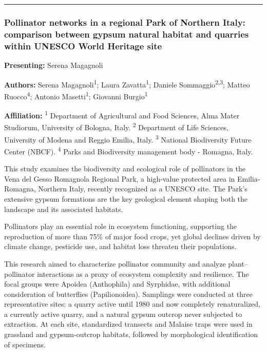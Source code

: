 \documentclass[
  letterpaper,
  DIV=11,
  numbers=noendperiod]{scrartcl}
\begin{document}
\begin{center}\rule{0.5\linewidth}{0.5pt}\end{center}

\subsubsection{Pollinator networks in a regional Park of Northern Italy:
comparison between gypsum natural habitat and quarries within UNESCO
World Heritage
site}\label{pollinator-networks-in-a-regional-park-of-northern-italy-comparison-between-gypsum-natural-habitat-and-quarries-within-unesco-world-heritage-site}

\textbf{Presenting:} Serena Magagnoli

\textbf{Authors:} Serena Magagnoli\textsuperscript{1}; Laura
Zavatta\textsuperscript{1}; Daniele Sommaggio\textsuperscript{2,3};
Matteo Ruocco\textsuperscript{4}; Antonio Masetti\textsuperscript{1};
Giovanni Burgio\textsuperscript{1}

\textbf{Affiliation:} \textsuperscript{1} Department of Agricultural and
Food Sciences, Alma Mater Studiorum, University of Bologna, Italy.
\textsuperscript{2} Department of Life Sciences, University of Modena
and Reggio Emilia, Italy. \textsuperscript{3} National Biodiversity
Future Center (NBCF). \textsuperscript{4} Parks and Biodiversity
management body - Romagna, Italy.

This study examines the biodiversity and ecological role of pollinators
in the Vena del Gesso Romagnola Regional Park, a high-value protected
area in Emilia-Romagna, Northern Italy, recently recognized as a UNESCO
site. The Park's extensive gypsum formations are the key geological
element shaping both the landscape and its associated habitats.

Pollinators play an essential role in ecosystem functioning, supporting
the reproduction of more than 75\% of major food crops, yet global
declines driven by climate change, pesticide use, and habitat loss
threaten their populations.

This research aimed to characterize pollinator community and analyze
plant--pollinator interactions as a proxy of ecosystem complexity and
resilience. The focal groups were Apoidea (Anthophila) and Syrphidae,
with additional consideration of butterflies (Papilionoidea). Samplings
were conducted at three representative sites: a quarry active until 1980
and now completely renaturalized, a currently active quarry, and a
natural gypsum outcrop never subjected to extraction. At each site,
standardized transects and Malaise traps were used in grassland and
gypsum-outcrop habitats, followed by morphological identification of
specimens.
\end{document}
